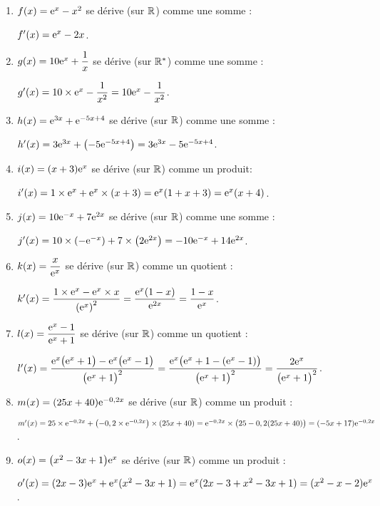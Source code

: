 \documentclass[a4paper,11pt]{article}
\begin{document}
\begin{enumerate}
	\item $f(x)={\rm e}^x-x^2$ se dérive (sur $\R$) comme une somme :
	
	\hspace{0.5cm}$f'(x)={\rm e}^x - 2x$.
	\item $g(x)=10{\rm e}^x+\dfrac1x$ se dérive (sur $\R^*$) comme une somme :
	
	\hspace{0.5cm}$g'(x)=10 \times {\rm e}^x - \dfrac{1}{x^2} = 10{\rm e}^x - \dfrac{1}{x^2}$.
	\item $h(x)={\rm e}^{3x}+{\rm e}^{-5x+4}$ se dérive (sur $\R$) comme une somme :
	
	\hspace{0.5cm}$h'(x)=3{\rm e}^{3x}+\left(-5{\rm e}^{-5x+4}\right)=3{\rm e}^{3x}-5{\rm e}^{-5x+4}$.
	\item $i(x)=(x+3){\rm e}^x$ se dérive (sur $\R$) comme un produit:
	
	\hspace{0.5cm}$i'(x)=1 \times {\rm e}^x + {\rm e}^x \times (x+3) = {\rm e}^x (1+x+3)={\rm e}^x(x+4)$.
	\item $j(x)=10{\rm e}^{-x}+7{\rm e}^{2x}$ se dérive (sur $\R$) comme une somme :
	
	\hspace{0.5cm}$j'(x)=10 \times \left(-{\rm e}^{-x}\right) + 7 \times \left(2{\rm e}^{2x}\right) = -10{\rm e}^{-x}+14{\rm e}^{2x}$.
	\item $k(x)=\dfrac{x}{{\rm e}^x}$ se dérive (sur $\R$) comme un quotient :
	
	\hspace{0.5cm}$k'(x)=\dfrac{1 \times {\rm e}^x - {\rm e}^x \times x}{\left({\rm e}^x\right)^2} = \dfrac{{\rm e}^x(1-x)}{{\rm e}^{2x}}=\dfrac{1-x}{{\rm e}^x}$.
	\item $l(x)=\dfrac{{\rm e}^x-1}{{\rm e}^x+1}$  se dérive (sur $\R$) comme un quotient :
	
	\hspace{0.5cm}$l'(x)=\dfrac{{\rm e}^x\big({\rm e}^x+1\big)-{\rm e}^x\big({\rm e}^x-1\big)}{\big({\rm e}^x+1\big)^2}=\dfrac{{\rm e}^x \big( {\rm e}^x+1-({\rm e}^x-1)\big)}{\big({\rm e}^x+1\big)^2} = \dfrac{2{\rm e}^x}{\big({\rm e}^x+1\big)^2}$.
	\item $m(x)=(25x+40){\rm e}^{-0,2x}$ se dérive (sur $\R$) comme un produit :
	
	\hspace{0.5cm}$m'(x)=25 \times {\rm e}^{-0,2x} + \left(-0,2 \times {\rm e}^{-0,2x}\right) \times (25x+40) = {\rm e}^{-0,2x} \times \big( 25-0,2(25x+40) \big) = (-5x+17){\rm e}^{-0,2x}$.
	\item $o(x)=\big(x^2-3x+1\big){\rm e}^x$ se dérive (sur $\R$) comme un produit :
	
	\hspace{0.5cm}$o'(x)=(2x-3){\rm e}^x+{\rm e}^x(x^2-3x+1)={\rm e}^x(2x-3+x^2-3x+1)=(x^2-x-2){\rm e}^x$.
\end{enumerate}
\end{document}
